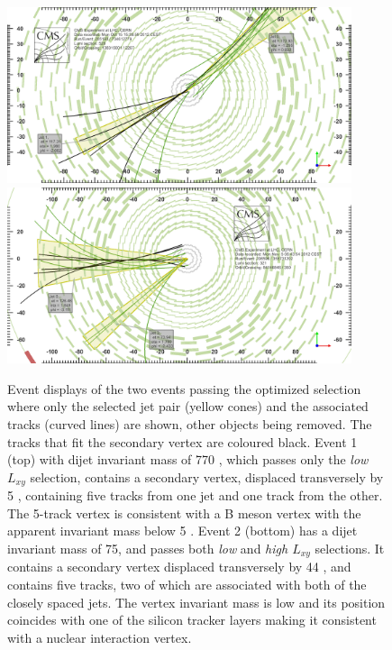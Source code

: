 \begin{figure}
\centering
\includegraphics[width=0.9\textwidth]{plots/displays/candidate1_display.png}
\includegraphics[width=0.9\textwidth]{plots/displays/candidate2_display.png}

\caption{Event displays of the two events passing the optimized selection where only the selected jet pair
 (yellow cones) and 
the associated tracks (curved lines) are shown, other objects being removed. The tracks that fit the secondary 
vertex are coloured black.  
Event 1 (top) with dijet invariant mass of 770 \GeV, which 
passes only the {\it low $L_{xy}$} selection, 
contains a secondary vertex, displaced transversely by 5 \cm, containing five tracks from one jet and one track
from the other. The 5-track vertex is consistent with a B meson vertex with the apparent invariant mass below 5 \GeV.
Event 2 (bottom) has a dijet invariant mass of 75\GeV, 
and passes both {\it low} and {\it high $L_{xy}$} selections. It contains a secondary vertex
 displaced transversely by 44 \cm, and contains five tracks, two of which are
associated with both of the closely spaced jets. The vertex invariant mass is low and its position
 coincides with one of the silicon 
tracker layers making it consistent with a nuclear interaction vertex. 
\label{fig:eventDisplays}}
\end{figure} 



